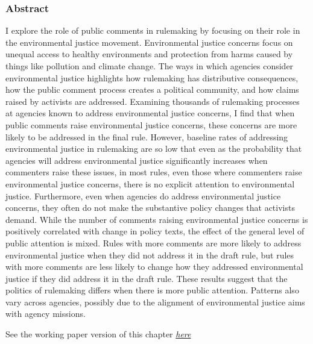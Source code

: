 \documentclass[
]{book}
\begin{document}
\hypertarget{abstract-4}{%
\subsubsection*{Abstract}\label{abstract-4}}

I explore the role of public comments in rulemaking by focusing on their role in the environmental justice movement. Environmental justice concerns focus on unequal access to healthy environments and protection from harms caused by things like pollution and climate change. The ways in which agencies consider environmental justice highlights how rulemaking has distributive consequences, how the public comment process creates a political community, and how claims raised by activists are addressed. Examining thousands of rulemaking processes at agencies known to address environmental justice concerns, I find that when public comments raise environmental justice concerns, these concerns are more likely to be addressed in the final rule. However, baseline rates of addressing environmental justice in rulemaking are so low that even as the probability that agencies will address environmental justice significantly increases when commenters raise these issues, in most rules, even those where commenters raise environmental justice concerns, there is no explicit attention to environmental justice. Furthermore, even when agencies do address environmental justice concerns, they often do not make the substantive policy changes that activists demand. While the number of comments raising environmental justice concerns is positively correlated with change in policy texts, the effect of the general level of public attention is mixed. Rules with more comments are more likely to address environmental justice when they did not address it in the draft rule, but rules with more comments are less likely to change how they addressed environmental justice if they did address it in the draft rule. These results suggest that the politics of rulemaking differs when there is more public attention. Patterns also vary across agencies, possibly due to the alignment of environmental justice aims with agency missions.

See the working paper version of this chapter \href{https://judgelord.github.io/research/ej/}{\emph{here}}

  
\end{document}
